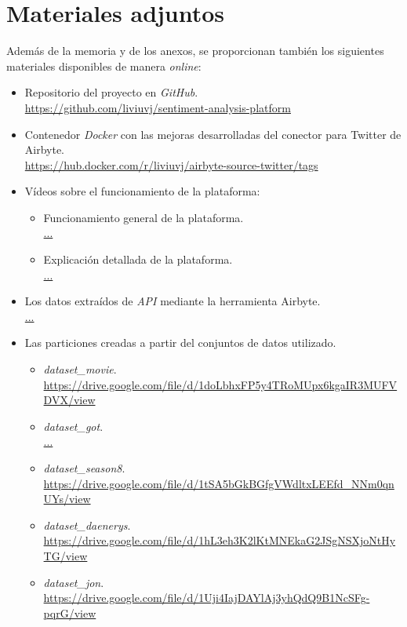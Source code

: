 \section{Materiales adjuntos}

Además de la memoria y de los anexos, se proporcionan también los siguientes materiales disponibles de manera \textit{online}:

\begin{itemize}
    \item Repositorio del proyecto en \textit{GitHub}.\\
        \url{https://github.com/liviuvj/sentiment-analysis-platform}
    
    \item Contenedor \textit{Docker} con las mejoras desarrolladas del conector para Twitter de  Airbyte.\\
        \url{https://hub.docker.com/r/liviuvj/airbyte-source-twitter/tags}

    \item Vídeos sobre el funcionamiento de la plataforma:
    \begin{itemize}
        \item Funcionamiento general de la plataforma.\\
            \url{...}
        \item Explicación detallada de la plataforma.\\
            \url{...}
    \end{itemize}

    \item Los datos extraídos de \textit{API} mediante la herramienta Airbyte.\\
        \url{...}

    \item Las particiones creadas a partir del conjuntos de datos utilizado.
    \begin{itemize}
        \item \textit{dataset\_movie}.\\
            \url{https://drive.google.com/file/d/1doLbhxFP5y4TRoMUpx6kgaIR3MUFVDVX/view}
        \item \textit{dataset\_got}.\\
            \url{...}
        \item \textit{dataset\_season8}.\\
            \url{https://drive.google.com/file/d/1tSA5bGkBGfgVWdltxLEEfd_NNm0qnUYs/view}
        \item \textit{dataset\_daenerys}.\\
            \url{https://drive.google.com/file/d/1hL3eh3K2lKtMNEkaG2JSgNSXjoNtHyTG/view}
        \item \textit{dataset\_jon}.\\
            \url{https://drive.google.com/file/d/1Uji4IajDAYlAj3yhQdQ9B1NcSFg-pqrG/view}
    \end{itemize}
    
\end{itemize}